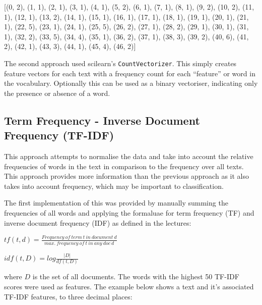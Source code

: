 \documentclass{article}
\begin{document}
[(0, 2), (1, 1), (2, 1), (3, 1), (4, 1), (5, 2), (6, 1), (7, 1), (8, 1), (9, 2), (10, 2), (11, 1), (12, 1), (13, 2), (14, 1), (15, 1), (16, 1), (17, 1), (18, 1), (19, 1), (20, 1), (21, 1), (22, 5), (23, 1), (24, 1), (25, 5), (26, 2), (27, 1), (28, 2), (29, 1), (30, 1), (31, 1), (32, 2), (33, 5), (34, 4), (35, 1), (36, 2), (37, 1), (38, 3), (39, 2), (40, 6), (41, 2), (42, 1), (43, 3), (44, 1), (45, 4), (46, 2)]

The second approach used scilearn's \verb|CountVectorizer|. This simply creates feature vectors for each text with a frequency count for each ``feature'' or word in the vocabulary. Optionally this can be used as a binary vectoriser, indicating only the presence or absence of a word.

\subsection{Term Frequency - Inverse Document Frequency (TF-IDF)}
This approach attempts to normalise the data and take into account the relative frequencies of words in the text in comparison to the frequency over all texts. This approach provides more information than the previous approach as it also takes into account frequency, which may be important to classification.

The first implementation of this was provided by manually summing the frequencies of all words and applying the formaluae for term frequency (TF) and inverse document frequency (IDF) as defined in the lectures:

\begin{center}
$tf(t, d) = \frac{Frequency\:of\:term\:t\:in\:document\:d}{max.\:frequency\:of\:t\:in\:any\:doc\:d}$
\end{center}

\begin{center}
$idf(t, D) = log\frac{|D|}{df(t,D)}$
\end{center}

where $D$ is the set of all documents. The words with the highest 50 TF-IDF scores were used as features. The example below shows a text and it's associated TF-IDF features, to three decimal places:
\end{document}
